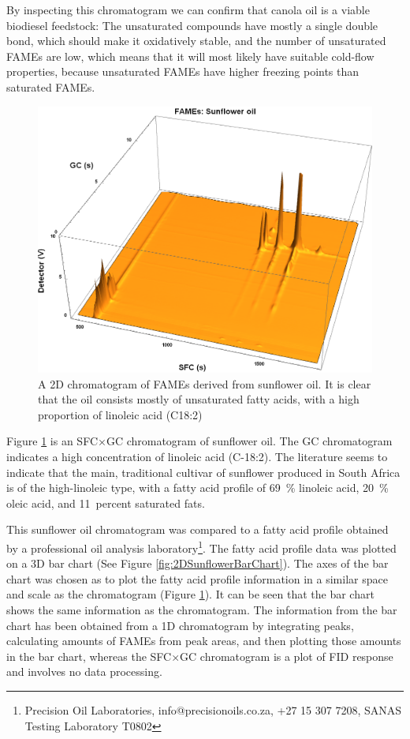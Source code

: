 By inspecting this chromatogram we can confirm that canola oil is a viable
biodiesel feedstock: The unsaturated compounds have mostly a single double bond,
which should make it oxidatively stable, and the number of unsaturated FAMEs are
low, which means that it will most likely have suitable cold-flow properties,
because unsaturated FAMEs have higher freezing points than saturated FAMEs.

\begin{figure}
\centering
\includegraphics[width=\textwidth]{Figures/Sunflower.png}
\decoRule

\caption[SFC×GC of sunflower oil]{A 2D chromatogram of FAMEs derived from
sunflower oil. It is clear that the oil consists mostly of unsaturated fatty
acids, with a high proportion of linoleic acid (C18:2)}

\label{fig:2DSunflower}
\end{figure}

Figure \ref{fig:2DSunflower} is an SFC×GC chromatogram of sunflower oil. The GC
chromatogram indicates a high concentration of linoleic acid (C-18:2). The
literature seems to indicate that the main, traditional cultivar of sunflower
produced in South Africa is of the high-linoleic type, with a fatty acid profile
of \SI{69}{\percent} linoleic acid, \SI{20}{\percent} oleic acid, and
\SI{11}{percent} saturated fats.

This sunflower oil chromatogram was compared to a fatty acid profile obtained by
a professional oil analysis laboratory\footnote{Precision Oil Laboratories,
info@precisionoils.co.za,  +27 15 307 7208, SANAS Testing Laboratory T0802}. The
fatty acid profile data was plotted on a 3D bar chart (See Figure
\ref{fig:2DSunflowerBarChart}). The axes of the bar chart was chosen as to plot
the fatty acid profile information in a similar space and scale as the
chromatogram (Figure \ref{fig:2DSunflower}). It can be seen that the bar chart
shows the same information as the chromatogram. The information from the bar
chart has been obtained from a 1D chromatogram by integrating peaks, calculating
amounts of FAMEs from peak areas, and then plotting those amounts in the bar
chart, whereas the SFC×GC chromatogram is a plot of FID response and involves no
data processing.

